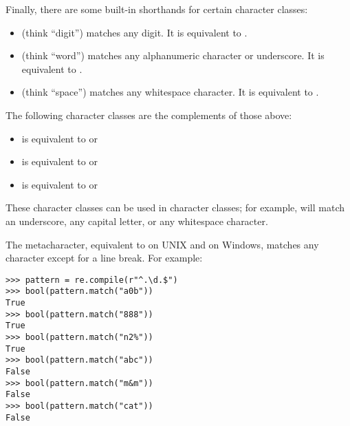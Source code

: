 Finally, there are some built-in shorthands for certain character classes: 
\begin{itemize}
    \item {} (think ``digit'') matches any digit. It is equivalent to .
    \item {} (think ``word'') matches any alphanumeric character or underscore. It is equivalent to .
    \item {} (think ``space'') matches any whitespace character. It is equivalent to .
\end{itemize}
The following character classes are the complements of those above:
\begin{itemize}
    \item {} is equivalent to  or 
    \item {} is equivalent to  or 
    \item {} is equivalent to  or 
\end{itemize}

These character classes can be used in character classes; for example,  will match an underscore, any capital letter, or any whitespace character.

The  metacharacter, equivalent to  on UNIX and  on Windows, matches any character except for a line break.
For example:
\begin{lstlisting}
>>> pattern = re.compile(r"^.\d.$")
>>> bool(pattern.match("a0b"))
True
>>> bool(pattern.match("888"))
True
>>> bool(pattern.match("n2%"))
True
>>> bool(pattern.match("abc"))
False
>>> bool(pattern.match("m&m"))
False
>>> bool(pattern.match("cat"))
False
\end{lstlisting}


